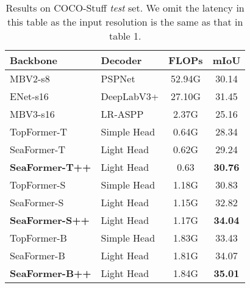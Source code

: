 \begin{table}
\vspace{-0cm}
\centering
    \begin{tabular}{ll |c | c}
        \hline

        \hline
        
        \hline
    Backbone  &  Decoder  & FLOPs     & mIoU  \\
        \hline

        \hline
        \hline
    MBV2-s8 & PSPNet& 52.94G & 30.14  \\
    ENet-s16& DeepLabV3+  & 27.10G & 31.45\\
        \hline

        \hline
        \hline
    MBV3-s16 & LR-ASPP & 2.37G &  25.16 \\
    TopFormer-T  & Simple Head & 0.64G & 28.34   \\
    SeaFormer-T & Light Head & 0.62G & 29.24   \\
   \textbf{ SeaFormer-T++} & Light Head & 0.63 & \textbf{30.76}   \\
        \hline

        \hline
        \hline  
    TopFormer-S  & Simple Head & 1.18G & 30.83  \\
    SeaFormer-S  & Light Head & 1.15G  & 32.82    \\
    \textbf{SeaFormer-S++}  & Light Head & 1.17G  & \textbf{34.04}    \\
        \hline

        \hline
        \hline    
    TopFormer-B  & Simple Head & 1.83G & 33.43\\
    SeaFormer-B  & Light Head &  1.81G  & 34.07 \\
    \textbf{SeaFormer-B++}  & Light Head &  1.84G  & \textbf{35.01} \\
        \hline

        \hline
        
        \hline
  \end{tabular}
\caption{Results on COCO-Stuff \textit{test} set. We omit the latency in this table as the input resolution is the same as that in table 1.}
\label{coco-stuff_table}

\end{table}